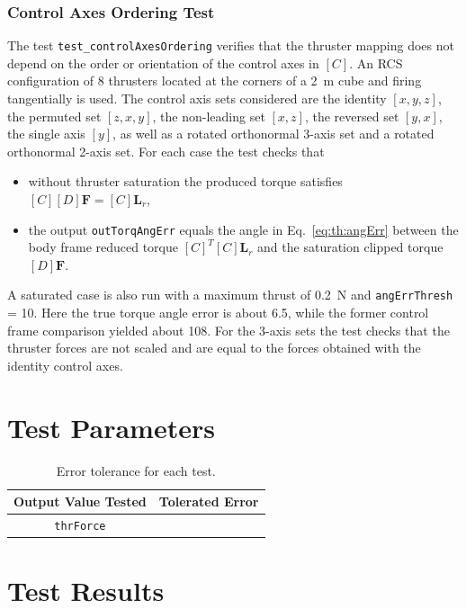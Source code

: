 \subsubsection{Control Axes Ordering Test}
The test {\tt test\_controlAxesOrdering} verifies that the thruster mapping does not depend on the order or orientation of the control axes in $[C]$.  An RCS configuration of 8 thrusters located at the corners of a 2~m cube and firing tangentially is used.  The control axis sets considered are the identity $[x,y,z]$, the permuted set $[z,x,y]$, the non-leading set $[x,z]$, the reversed set $[y,x]$, the single axis $[y]$, as well as a rotated orthonormal 3-axis set and a rotated orthonormal 2-axis set.  For each case the test checks that
\begin{itemize}
	\item without thruster saturation the produced torque satisfies $[C][D]\bm F = [C]\bm L_{r}$,
	\item the output {\tt outTorqAngErr} equals the angle in Eq.~\eqref{eq:th:angErr} between the body frame reduced torque $[C]^{T}[C]\bm L_{r}$ and the saturation clipped torque $[D]\bm F$.
\end{itemize}
A saturated case is also run with a maximum thrust of 0.2~N and {\tt angErrThresh} = 10\dg.  Here the true torque angle error is about 6.5\dg, while the former control frame comparison yielded about 108\dg.  For the 3-axis sets the test checks that the thruster forces are not scaled and are equal to the forces obtained with the identity control axes.


\section{Test Parameters}


\begin{table}[htbp]
	\caption{Error tolerance for each test.}
	\label{tab:errortol}
	\centering \fontsize{10}{10}\selectfont
	\begin{tabular}{ c | c } %
		\hline\hline
		\textbf{Output Value Tested}  & \textbf{Tolerated Error}  \\
		\hline
		{\tt thrForce}        & 	   \\
		\hline\hline
	\end{tabular}
\end{table}




\section{Test Results}

